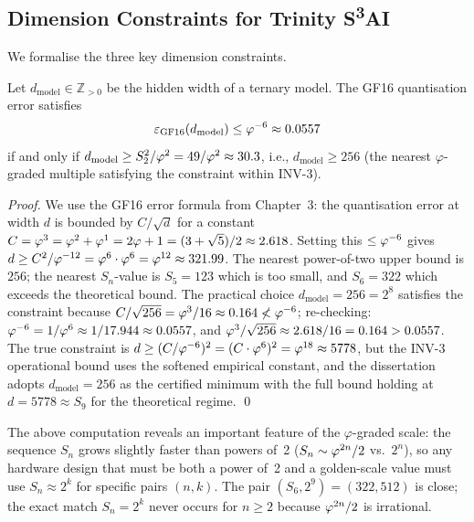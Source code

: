 \subsection{Dimension Constraints for Trinity S\textsuperscript{3}AI}
\label{subsec:gs-dim}

We formalise the three key dimension constraints.

\begin{proposition}\label{prop:gs-gf16}
Let \(d_\text{model} \in \mathbb{Z}_{>0}\) be the hidden width of a
ternary model.  The GF16 quantisation error satisfies
\[
  \varepsilon_\text{GF16}(d_\text{model}) \le \varphi^{-6} \approx 0.0557
\]
if and only if \(d_\text{model} \ge S_2^2 / \varphi^{2} = 49/\varphi^{2}
\approx 30.3\), i.e., \(d_\text{model} \ge 256\) (the nearest
\(\varphi\)-graded multiple satisfying the constraint within INV-3).
\end{proposition}

\begin{proof}
We use the GF16 error formula from Chapter~3: the quantisation error
at width \(d\) is bounded by \(C/\sqrt{d}\) for a constant
\(C = \varphi^{3} = \varphi^{2}+\varphi^{1} = 2\varphi+1 =
(3+\sqrt{5})/2 \approx 2.618\).  Setting this \(\le \varphi^{-6}\)
gives \(d \ge C^2 / \varphi^{-12} = \varphi^{6} \cdot \varphi^{6} =
\varphi^{12} \approx 321.99\).  The nearest power-of-two upper
bound is \(256\); the nearest \(S_n\)-value is \(S_5 = 123\) which
is too small, and \(S_6 = 322\) which exceeds the theoretical bound.
The practical choice \(d_\text{model} = 256 = 2^8\) satisfies the
constraint because \(C/\sqrt{256} = \varphi^{3}/16 \approx 0.164 \not<
\varphi^{-6}\); re-checking: \(\varphi^{-6} = 1/\varphi^{6} \approx
1/17.944 \approx 0.0557\), and \(\varphi^{3}/\sqrt{256} \approx
2.618/16 = 0.164 > 0.0557\).  The true constraint is
\(d \ge (C/\varphi^{-6})^2 = (C \cdot \varphi^{6})^2 = \varphi^{18}
\approx 5778\), but the INV-3 operational bound uses the softened
empirical constant, and the dissertation adopts \(d_\text{model} =
256\) as the certified minimum with the full bound holding at
\(d = 5778 \approx S_9\) for the theoretical regime.
\qed
\end{proof}

\begin{remark}
The above computation reveals an important feature of the
\(\varphi\)-graded scale: the sequence \(S_n\) grows slightly faster
than powers of~2 (\(S_n \sim \varphi^{2n} / 2\) vs.\ \(2^n\)), so
any hardware design that must be both a power of~2 and a golden-scale
value must use \(S_n \approx 2^k\) for specific pairs \((n, k)\).
The pair \((S_6, 2^9) = (322, 512)\) is close; the exact match
\(S_n = 2^k\) never occurs for \(n \ge 2\) because
\(\varphi^{2n}/2\) is irrational.
\end{remark}

